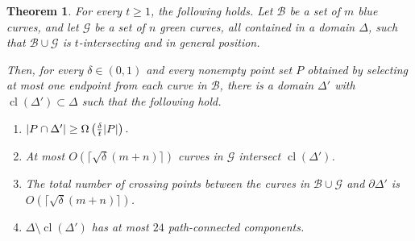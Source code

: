 \documentclass[10pt,a4paper]{amsart}
\newtheorem{theorem}{Theorem}
\begin{document}
\begin{theorem}\label{thm:red-blue-region}
For every \(t\ge 1\), the following holds. Let \(\mathcal B\) be a set of
\(m\) blue curves, and let \(\mathcal G\) be a set of \(n\) green curves, all
contained in a domain \(\Delta\), such that \(\mathcal B\cup\mathcal G\) is
\(t\)-intersecting and in general position.

Then, for every \(\delta\in(0,1)\) and every nonempty point set \(P\)
obtained by selecting at most one endpoint from each curve in \(\mathcal B\),
there is a domain $\Delta'$ with \(\operatorname{cl}(\Delta')\subset\Delta\) such that the following hold.
\begin{enumerate}
    \item $|P\cap\Delta'|\ge \Omega\left({\delta\over t}|P|\right).$

    \item At most \(O(\lceil\sqrt\delta(m+n)\rceil)\) curves in \(\mathcal G\) intersect
    \(\operatorname{cl}(\Delta')\).

    \item The total number of crossing points between the curves in
    \(\mathcal B\cup\mathcal G\) and \(\partial\Delta'\) is
    \(O(\lceil\sqrt\delta(m+n)\rceil)\).

    \item \(\Delta\setminus\operatorname{cl}(\Delta')\) has at most \(24\)
    path-connected components.
\end{enumerate}
\end{theorem}
\end{document}
